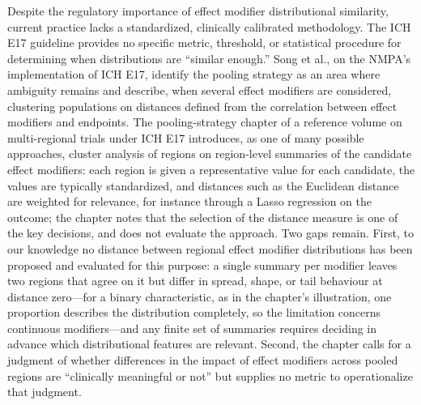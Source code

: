 \documentclass[AMA,Times1COL]{WileyNJDv5}
\begin{document}
Despite the regulatory importance of effect modifier distributional similarity, current practice lacks a standardized, clinically calibrated methodology. The ICH E17 guideline provides no specific metric, threshold, or statistical procedure for determining when distributions are ``similar enough.'' Song et al., on the NMPA's implementation of ICH E17, identify the pooling strategy as an area where ambiguity remains and describe, when several effect modifiers are considered, clustering populations on distances defined from the correlation between effect modifiers and endpoints.\cite{song2025} The pooling-strategy chapter of a reference volume on multi-regional trials under ICH E17 introduces, as one of many possible approaches, cluster analysis of regions on region-level summaries of the candidate effect modifiers: each region is given a representative value for each candidate, the values are typically standardized, and distances such as the Euclidean distance are weighted for relevance, for instance through a Lasso regression on the outcome; the chapter notes that the selection of the distance measure is one of the key decisions, and does not evaluate the approach.\cite{komiyama2024} Two gaps remain. First, to our knowledge no distance between regional effect modifier distributions has been proposed and evaluated for this purpose: a single summary per modifier leaves two regions that agree on it but differ in spread, shape, or tail behaviour at distance zero---for a binary characteristic, as in the chapter's illustration, one proportion describes the distribution completely, so the limitation concerns continuous modifiers---and any finite set of summaries requires deciding in advance which distributional features are relevant. Second, the chapter calls for a judgment of whether differences in the impact of effect modifiers across pooled regions are ``clinically meaningful or not'' but supplies no metric to operationalize that judgment.
\end{document}
